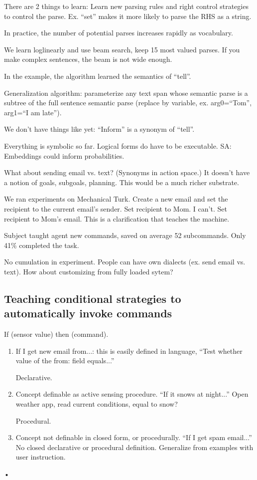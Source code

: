 There are 2 things to learn: Learn new parsing rules and right control strategies to control the parse. Ex. ``set'' makes it more likely to parse the RHS as a string.

In practice, the number of potential parses increases rapidly as vocabulary.

We learn loglinearly and use beam search, keep 15 most valued parses. If you make complex sentences, the beam is not wide enough.

In the example, the algorithm learned the semantics of ``tell''.

Generalization algorithm: parameterize any text span whose semantic parse is a subtree of the full sentence semantic parse (replace by variable, ex. arg0=``Tom'', arg1=``I am late'').

We don't have things like yet: ``Inform'' is a synonym of ``tell''.

Everything is symbolic so far. Logical forms do have to be executable. SA: Embeddings could inform probabilities. %

What about sending email vs. text? (Synonyms in action space.) It doesn't have a notion of goals, subgoals, planning. This would be a much richer substrate.


We ran experiments on Mechanical Turk. Create a new email and set the recipient to the current email's sender. %
Set recipient to Mom. I can't. Set recipient to Mom's email. This is a clarification that teaches the machine.

Subject taught agent new commands, saved on average 52 subcommands. Only 41\% completed the task.

No cumulation in experiment. %
People can have own dialects (ex. send email vs. text). How about customizing from fully loaded sytem?

\subsection{Teaching conditional strategies to automatically invoke commands}

If (sensor value) then (command).
\begin{enumerate}
\item
If I get new email from...: this is easily defined in language, ``Test whether value of the from: field equals...''

Declarative.
\item
Concept definable as active sensing procedure. ``If it snows at night...'' Open weather app, read current conditions, equal to snow?

Procedural.
\item
Concept not definable in closed form, or procedurally. ``If I get spam email...'' No closed declarative or procedural definition. Generalize from examples with user instruction.
\end{enumerate}•

